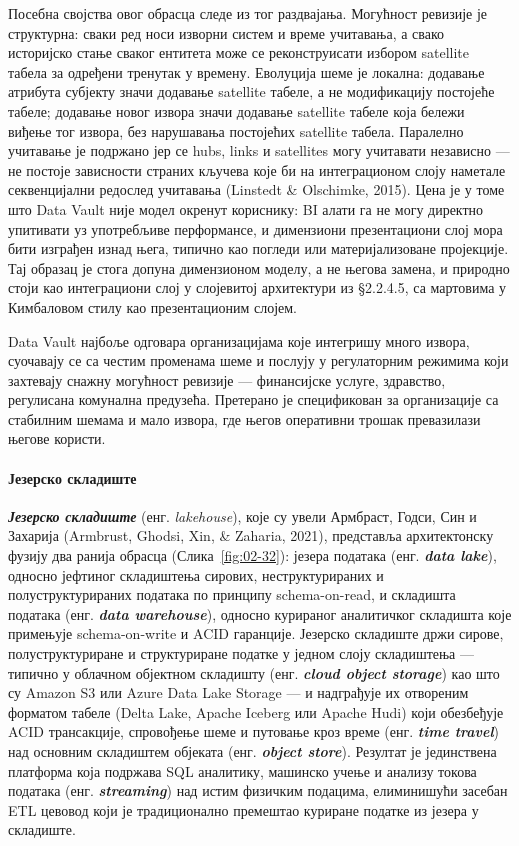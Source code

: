 Посебна својства овог обрасца следе из тог раздвајања. Могућност ревизије је структурна: сваки ред носи изворни систем и време учитавања, а свако историјско стање сваког ентитета може се реконструисати избором satellite табела за одређени тренутак у времену. Еволуција шеме је локална: додавање атрибута субјекту значи додавање satellite табеле, а не модификацију постојеће табеле; додавање новог извора значи додавање satellite табеле која бележи виђење тог извора, без нарушавања постојећих satellite табела. Паралелно учитавање је подржано јер се hubs, links и satellites могу учитавати независно — не постоје зависности страних кључева које би на интеграционом слоју наметале секвенцијални редослед учитавања (Linstedt \& Olschimke, 2015). Цена је у томе што Data Vault није модел окренут кориснику: BI алати га не могу директно упитивати уз употребљиве перформансе, и димензиони презентациони слој мора бити изграђен изнад њега, типично као погледи или материјализоване пројекције. Тај образац је стога допуна димензионом моделу, а не његова замена, и природно стоји као интеграциони слој у слојевитој архитектури из §2.2.4.5, са мартовима у Кимбаловом стилу као презентационим слојем.

Data Vault најбоље одговара организацијама које интегришу много извора, суочавају се са честим променама шеме и послују у регулаторним режимима који захтевају снажну могућност ревизије — финансијске услуге, здравство, регулисана комунална предузећа. Претерано је спецификован за организације са стабилним шемама и мало извора, где његов оперативни трошак превазилази његове користи.

\paragraph{Језерско складиште}
\textbf{\textit{Језерско складиште}} (енг. \textit{lakehouse}), које су увели Армбраст, Годси, Син и Захарија (Armbrust, Ghodsi, Xin, \& Zaharia, 2021), представља архитектонску фузију два ранија обрасца (Слика~\ref{fig:02-32}): језера података (енг. \textbf{\textit{data lake}}), односно јефтиног складиштења сирових, неструктурираних и полуструктурираних података по принципу schema-on-read, и складишта података (енг. \textbf{\textit{data warehouse}}), односно курираног аналитичког складишта које примењује schema-on-write и ACID гаранције. Језерско складиште држи сирове, полуструктуриране и структуриране податке у једном слоју складиштења — типично у облачном објектном складишту (енг. \textbf{\textit{cloud object storage}}) као што су Amazon S3 или Azure Data Lake Storage — и надграђује их отвореним форматом табеле (Delta Lake, Apache Iceberg или Apache Hudi) који обезбеђује ACID трансакције, спровођење шеме и путовање кроз време (енг. \textbf{\textit{time travel}}) над основним складиштем објеката (енг. \textbf{\textit{object store}}). Резултат је јединствена платформа која подржава SQL аналитику, машинско учење и анализу токова података (енг. \textbf{\textit{streaming}}) над истим физичким подацима, елиминишући засебан ETL цевовод који је традиционално премештао куриране податке из језера у складиште.

